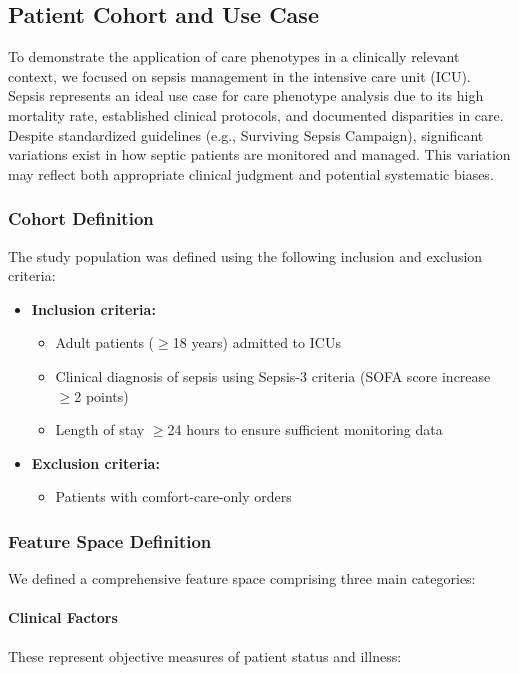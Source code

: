 \documentclass[12pt]{article}
\begin{document}
\subsection{Patient Cohort and Use Case}

To demonstrate the application of care phenotypes in a clinically relevant context, we focused on sepsis management in the intensive care unit (ICU). Sepsis represents an ideal use case for care phenotype analysis due to its high mortality rate, established clinical protocols, and documented disparities in care. Despite standardized guidelines (e.g., Surviving Sepsis Campaign), significant variations exist in how septic patients are monitored and managed. This variation may reflect both appropriate clinical judgment and potential systematic biases.

\subsubsection{Cohort Definition}

The study population was defined using the following inclusion and exclusion criteria:

\begin{itemize}
    \item \textbf{Inclusion criteria:}
    \begin{itemize}
        \item Adult patients ($\geq$18 years) admitted to ICUs
        \item Clinical diagnosis of sepsis using Sepsis-3 criteria (SOFA score increase $\geq$2 points)
        \item Length of stay $\geq$24 hours to ensure sufficient monitoring data
    \end{itemize}
    \item \textbf{Exclusion criteria:}
    \begin{itemize}
        \item Patients with comfort-care-only orders
    \end{itemize}
\end{itemize}

\subsubsection{Feature Space Definition}

We defined a comprehensive feature space comprising three main categories:

\paragraph{Clinical Factors} These represent objective measures of patient status and illness:
\end{document}
